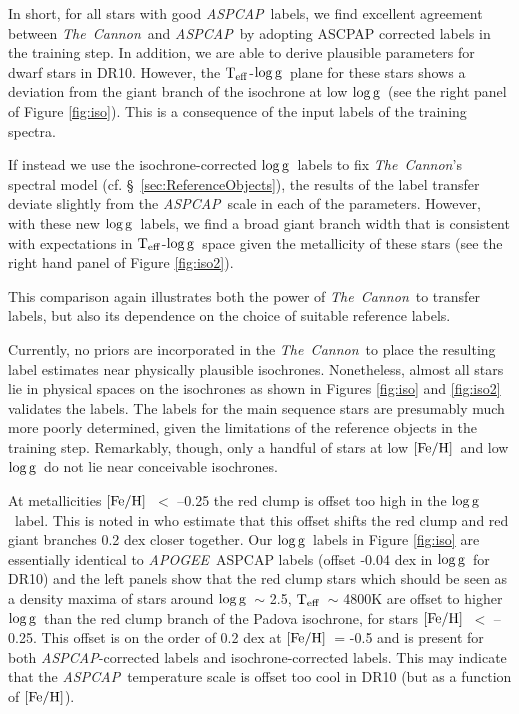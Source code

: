 \documentclass[12pt, preprint]{aastex}
\newcommand{\teff}{\mbox{$\rm T_{eff}$}}
\newcommand{\feh}{\mbox{$\rm [Fe/H]$}}
\newcommand{\logg}{\mbox{$\rm \log g$}}
\newcommand{\tc}{\textsl{The~Cannon}}
\newcommand{\apogee}{\textsl{APOGEE}}
\newcommand{\aspcap}{\textsl{ASPCAP}}
\begin{document}
In short, for all stars with good \aspcap\ labels, we find excellent agreement between \tc\ and \aspcap\ by adopting ASCPAP corrected labels in the training step.
In addition, we are able to derive plausible parameters for dwarf stars in DR10. However, the \teff-\logg\ plane for these stars shows a deviation from the giant branch of the isochrone at low \logg\ (see the right panel of Figure \ref{fig:iso}). This is a consequence of the input labels of the training spectra. 

If instead we use the isochrone-corrected \logg\ labels to fix \tc 's spectral model
(cf. \S~\ref{sec:ReferenceObjects}), the results of the label transfer deviate slightly from the \aspcap\ scale in each of the parameters. 
However, with these new \logg\ labels, we find a broad giant branch width that is consistent with expectations in \teff-\logg\ space 
given the metallicity of these stars (see the right hand panel of Figure \ref{fig:iso2}). 

This comparison again illustrates both the power of \tc\ to transfer labels, but also its dependence on the choice of suitable reference labels. 

Currently, no priors are incorporated in the \tc\ to place the resulting label estimates near physically plausible isochrones. 
Nonetheless, almost all stars lie in physical spaces on the isochrones as shown in Figures \ref{fig:iso} and \ref{fig:iso2} validates the labels. 
The labels for the main sequence stars are presumably much more poorly determined, given the limitations of the reference objects in the training step. 
Remarkably, though, only a handful of stars at low \feh\ and low \logg\ do not lie near conceivable isochrones. 

At metallicities \feh\ $<$ --0.25 the red clump is offset too high in the \logg\ label. This is noted in \citet{bovy2014} who estimate that this offset shifts the red clump and red giant branches 0.2 dex closer together. 
Our \logg\ labels in Figure \ref{fig:iso} are essentially identical to \apogee\ ASPCAP labels (offset -0.04 dex in \logg\ for DR10) and the left panels show that the red clump stars which should be seen as a density maxima of stars around \logg\ $\sim$ 2.5, \teff\ $\sim$ 4800K \citep[e.g.][]{Zhao2001} 
are offset to higher \logg\ than the red clump branch of the Padova isochrone, for stars \feh\ $<$ --0.25. 
This offset is on the order of 0.2 dex at \feh\ = -0.5 and is present for both \aspcap-corrected labels and isochrone-corrected labels. 
This may indicate that the \aspcap\ temperature scale is offset too cool in DR10 (but as a function of \feh).
\end{document}
